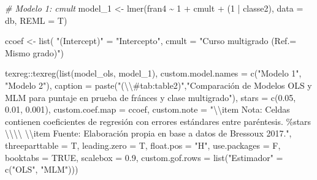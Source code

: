 \documentclass[
  12pt,
  a4paper,
]{article}
\newenvironment{Shaded}{\begin{snugshade}}{\end{snugshade}}
\newcommand{\AttributeTok}[1]{\textcolor[rgb]{0.77,0.63,0.00}{#1}}
\newcommand{\CommentTok}[1]{\textcolor[rgb]{0.56,0.35,0.01}{\textit{#1}}}
\newcommand{\ConstantTok}[1]{\textcolor[rgb]{0.00,0.00,0.00}{#1}}
\newcommand{\DecValTok}[1]{\textcolor[rgb]{0.00,0.00,0.81}{#1}}
\newcommand{\FloatTok}[1]{\textcolor[rgb]{0.00,0.00,0.81}{#1}}
\newcommand{\FunctionTok}[1]{\textcolor[rgb]{0.00,0.00,0.00}{#1}}
\newcommand{\NormalTok}[1]{#1}
\newcommand{\OtherTok}[1]{\textcolor[rgb]{0.56,0.35,0.01}{#1}}
\newcommand{\SpecialCharTok}[1]{\textcolor[rgb]{0.00,0.00,0.00}{#1}}
\newcommand{\StringTok}[1]{\textcolor[rgb]{0.31,0.60,0.02}{#1}}
\begin{document}
\begin{Shaded}
\begin{Highlighting}[]
\CommentTok{\# Modelo 1: cmult}
\NormalTok{model\_1 }\OtherTok{\textless{}{-}} \FunctionTok{lmer}\NormalTok{(fran4 }\SpecialCharTok{\textasciitilde{}} \DecValTok{1} \SpecialCharTok{+}\NormalTok{ cmult }\SpecialCharTok{+}\NormalTok{ (}\DecValTok{1} \SpecialCharTok{|}\NormalTok{ classe2),}
                \AttributeTok{data =}\NormalTok{ db, }
                \AttributeTok{REML =}\NormalTok{ T)}


\NormalTok{ccoef }\OtherTok{\textless{}{-}} \FunctionTok{list}\NormalTok{(}
  \StringTok{"(Intercept)"} \OtherTok{=} \StringTok{"Intercepto"}\NormalTok{,}
  \AttributeTok{cmult =} \StringTok{"Curso multigrado (Ref.= Mismo grado)"}\NormalTok{)}


\NormalTok{texreg}\SpecialCharTok{::}\FunctionTok{texreg}\NormalTok{(}\FunctionTok{list}\NormalTok{(model\_ols, model\_1),}
               \AttributeTok{custom.model.names =} \FunctionTok{c}\NormalTok{(}\StringTok{"Modelo 1"}\NormalTok{,}
                                      \StringTok{"Modelo 2"}\NormalTok{),}
               \AttributeTok{caption =} \FunctionTok{paste}\NormalTok{(}\StringTok{"(}\SpecialCharTok{\textbackslash{}\textbackslash{}}\StringTok{\#tab:table2)"}\NormalTok{,}\StringTok{"Comparación de Modelos OLS y MLM para puntaje en prueba de fránces y clase multigrado"}\NormalTok{),}
               \AttributeTok{stars =} \FunctionTok{c}\NormalTok{(}\FloatTok{0.05}\NormalTok{, }\FloatTok{0.01}\NormalTok{, }\FloatTok{0.001}\NormalTok{),}
               \AttributeTok{custom.coef.map =}\NormalTok{ ccoef,}
               \AttributeTok{custom.note =} \StringTok{"}\SpecialCharTok{\textbackslash{}\textbackslash{}}\StringTok{item Nota: Celdas contienen coeficientes de regresión con errores estándares entre paréntesis. \%stars }\SpecialCharTok{\textbackslash{}\textbackslash{}\textbackslash{}\textbackslash{}}\StringTok{ }\SpecialCharTok{\textbackslash{}\textbackslash{}}\StringTok{item Fuente: Elaboración propia en base a datos de Bressoux 2017."}\NormalTok{,}
               \AttributeTok{threeparttable =}\NormalTok{ T,}
               \AttributeTok{leading.zero =}\NormalTok{ T,}
               \AttributeTok{float.pos =} \StringTok{"H"}\NormalTok{,}
               \AttributeTok{use.packages =}\NormalTok{ F,}
               \AttributeTok{booktabs =} \ConstantTok{TRUE}\NormalTok{,}
               \AttributeTok{scalebox =} \FloatTok{0.9}\NormalTok{,}
               \AttributeTok{custom.gof.rows =} \FunctionTok{list}\NormalTok{(}\StringTok{"Estimador"} \OtherTok{=} \FunctionTok{c}\NormalTok{(}\StringTok{"OLS"}\NormalTok{, }\StringTok{"MLM"}\NormalTok{)))}



\end{Highlighting}
\end{Shaded}
\end{document}
